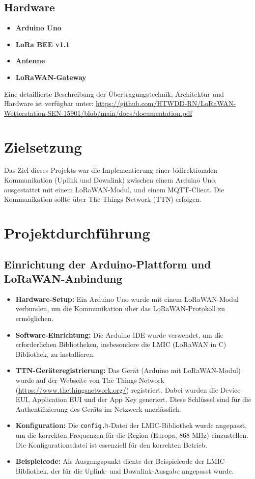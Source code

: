 \documentclass[12pt,a4paper]{article}
\begin{document}
\subsection{Hardware}
\begin{itemize}
\item \textbf{Arduino Uno}     
\item \textbf{LoRa BEE v1.1}     
\item \textbf{Antenne}     
\item \textbf{LoRaWAN-Gateway} 
\end{itemize}
Eine detaillierte Beschreibung der Übertragungstechnik, Architektur und Hardware ist verfügbar unter:
\url{https://github.com/HTWDD-RN/LoRaWAN-Wetterstation-SEN-15901/blob/main/docs/documentation.pdf}

\section{Zielsetzung}

Das Ziel dieses Projekts war die Implementierung einer bidirektionalen Kommunikation (Uplink und Downlink) zwischen einem Arduino Uno, ausgestattet mit einem LoRaWAN-Modul, und einem MQTT-Client. Die Kommunikation sollte über The Things Network (TTN) erfolgen.

\section{Projektdurchführung}

\subsection{Einrichtung der Arduino-Plattform und LoRaWAN-Anbindung}

\begin{itemize}
    \item \textbf{Hardware-Setup:} Ein Arduino Uno wurde mit einem LoRaWAN-Modul verbunden, um die Kommunikation über das LoRaWAN-Protokoll zu ermöglichen.
    \item \textbf{Software-Einrichtung:} Die Arduino IDE wurde verwendet, um die erforderlichen Bibliotheken, insbesondere die LMIC (LoRaWAN in C) Bibliothek, zu installieren.
    \item \textbf{TTN-Geräteregistrierung:} Das Gerät (Arduino mit LoRaWAN-Modul) wurde auf der Webseite von The Things Network (\url{https://www.thethingsnetwork.org/}) registriert.  Dabei wurden die Device EUI, Application EUI und der App Key generiert. Diese Schlüssel sind für die Authentifizierung des Geräts im Netzwerk unerlässlich.
    \item \textbf{Konfiguration:} Die \texttt{config.h}-Datei der LMIC-Bibliothek wurde angepasst, um die korrekten Frequenzen für die Region (Europa, 868 MHz) einzustellen. Die Konfigurationsdatei ist essenziell für den korrekten Betrieb.
    \item \textbf{Beispielcode:} Als Ausgangspunkt diente der Beispielcode der LMIC-Bibliothek, der für die Uplink- und Downlink-Ausgabe angepasst wurde.
\end{itemize}
\end{document}
